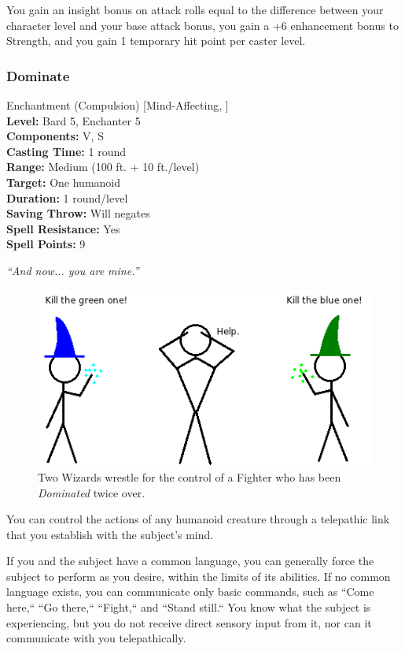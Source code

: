 You gain an insight bonus on attack rolls equal to the difference between your character level and your base attack bonus, you gain a +6 enhancement bonus to Strength, and you gain 1 temporary hit point per caster level.
\subsubsection{Dominate}
\label{Spell:Dominate}
Enchantment (Compulsion) [Mind-Affecting, ]
\\ \textbf{Level:} Bard 5, Enchanter 5
\\ \textbf{Components:} V, S
\\ \textbf{Casting Time:} 1 round
\\ \textbf{Range:} Medium (100 ft. + 10 ft./level)
\\ \textbf{Target:} One humanoid
\\ \textbf{Duration:} 1 round/level
\\ \textbf{Saving Throw:} Will negates
\\ \textbf{Spell Resistance:} Yes
\\ \textbf{Spell Points:} 9

\emph{``And now... you are mine.''}

\begin{figure}
  \caption{Two Wizards wrestle for the control of a Fighter who has been \emph{Dominated} twice over.}
  \centering
    \includegraphics{Pics/Dominate.png}
\end{figure}

You can control the actions of any humanoid creature through a telepathic link that you establish with the subject's mind.

If you and the subject have a common language, you can generally force the subject to perform as you desire, within the limits of its abilities. 
If no common language exists, you can communicate only basic commands, such as ``Come here,`` ``Go there,`` ``Fight,`` and ``Stand still.`` 
You know what the subject is experiencing, but you do not receive direct sensory input from it, nor can it communicate with you telepathically.

